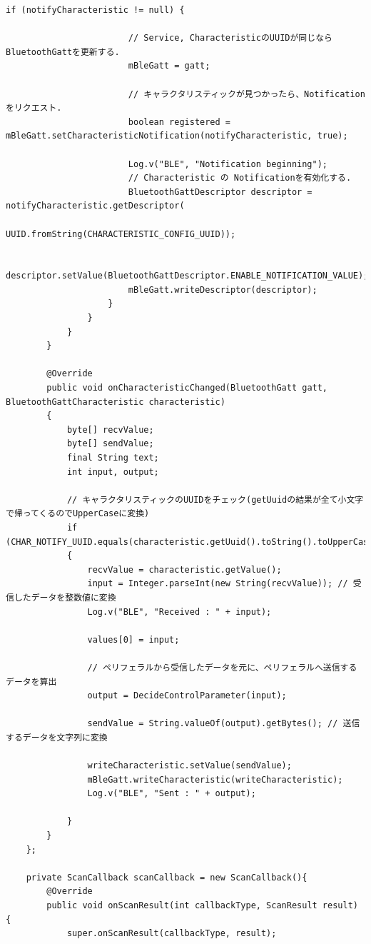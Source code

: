 \documentclass[dvipdfmx,autodetect-engine,titlepage]{jsarticle}
\begin{document}
\begin{lstlisting}[caption=Java.py,label=Java]
                    if (notifyCharacteristic != null) {

                        // Service, CharacteristicのUUIDが同じならBluetoothGattを更新する.
                        mBleGatt = gatt;

                        // キャラクタリスティックが見つかったら、Notificationをリクエスト.
                        boolean registered = mBleGatt.setCharacteristicNotification(notifyCharacteristic, true);

                        Log.v("BLE", "Notification beginning");
                        // Characteristic の Notificationを有効化する.
                        BluetoothGattDescriptor descriptor = notifyCharacteristic.getDescriptor(
                                UUID.fromString(CHARACTERISTIC_CONFIG_UUID));

                        descriptor.setValue(BluetoothGattDescriptor.ENABLE_NOTIFICATION_VALUE);
                        mBleGatt.writeDescriptor(descriptor);
                    }
                }
            }
        }

        @Override
        public void onCharacteristicChanged(BluetoothGatt gatt, BluetoothGattCharacteristic characteristic)
        {
            byte[] recvValue;
            byte[] sendValue;
            final String text;
            int input, output;

            // キャラクタリスティックのUUIDをチェック(getUuidの結果が全て小文字で帰ってくるのでUpperCaseに変換)
            if (CHAR_NOTIFY_UUID.equals(characteristic.getUuid().toString().toUpperCase()))
            {
                recvValue = characteristic.getValue();
                input = Integer.parseInt(new String(recvValue)); // 受信したデータを整数値に変換
                Log.v("BLE", "Received : " + input);

                values[0] = input;

                // ペリフェラルから受信したデータを元に、ペリフェラルへ送信するデータを算出
                output = DecideControlParameter(input);

                sendValue = String.valueOf(output).getBytes(); // 送信するデータを文字列に変換

                writeCharacteristic.setValue(sendValue);
                mBleGatt.writeCharacteristic(writeCharacteristic);
                Log.v("BLE", "Sent : " + output);

            }
        }
    };

    private ScanCallback scanCallback = new ScanCallback(){
        @Override
        public void onScanResult(int callbackType, ScanResult result) {
            super.onScanResult(callbackType, result);


\end{lstlisting}
\end{document}
